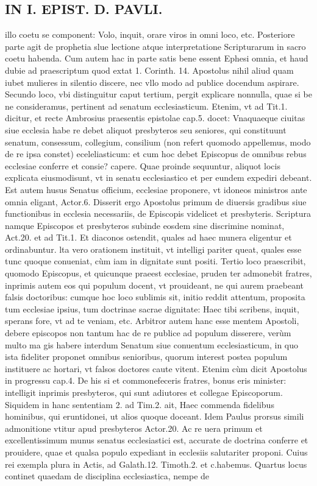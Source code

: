 \documentclass{article}
\begin{document}
\begin{pages}
\section*{IN I. EPIST. D. PAVLI. }
\marginpar{[ p.2 ]}\pstart illo coetu se component: Volo, inquit, orare viros in omni loco, etc. Posteriore parte agit de prophetia slue lectione atque  interpretatione Scripturarum in sacro coetu habenda.  \pend\pstart Cum autem hac in parte satis bene essent Ephesi omnia, et haud dubie ad praescriptum quod extat 1. Corinth. 14. Apostolus nihil aliud quam iubet mulieres in silentio discere, nec vllo modo ad publice docendum aspirare.  \pend\pstart Secundo loco, vbi distinguitur caput tertium, pergit explicare nonnulla, quae si be ne consideramus, pertinent ad senatum ecclesiasticum. Etenim, vt ad Tit.1. dicitur, et recte Ambrosius praesentis epistolae cap.5. docet: Vnaquaeque  ciuitas siue ecclesia habe re debet aliquot presbyteros seu seniores, qui constituunt senatum, consessum, collegium, consilium (non refert quomodo appellemus, modo de re ipsa constet) eceleliasticum: et cum hoc debet Episcopus de omnibus rebus ecclesiae conferre et consie? capere. Quae proinde sequuntur, aliquot locis explicata eiusmodisunt, vt in senatu ecclesiastico et per eundem expediri debeant. Est autem husus Senatus officium, ecclesiae proponere, vt idoneos ministros ante omnia eligant, Actor.6. Disserit ergo Apostolus primum de diuersis gradibus siue functionibus in ecclesia necessariis, de Episcopis videlicet et presbyteris. Scriptura namque  Episcopos et presbyteros subinde eosdem sine discrimine nominat, Act.20. et ad Tit.1. Et diaconos ostendit, quales ad haec munera eligentur et ordinabuntur. lta vero orationem instituit, vt intelligi pariter queat, quales esse tunc quoque  conueniat, cùm iam in dignitate sunt positi.  \pend\pstart Tertio loco praescribit, quomodo Episcopus, et quicunque  praeest ecclesiae, pruden ter admonebit fratres, inprimis autem eos qui populum docent, vt prouideant, ne qui aurem praebeant falsis doctoribus: cumque  hoc loco sublimis sit, initio reddit attentum, proposita tum ecclesiae ipsius, tum doctrinae sacrae dignitate: Haec tibi scribens, inquit, sperans fore, vt ad te veniam, etc. Arbitror autem hanc esse mentem Apostoli, debere episcopos non tantum hac de re publice ad populum disserere, verùm multo ma gis habere interdum Senatum siue conuentum ecclesiasticum, in quo ista fideliter proponet omnibus senioribus, quorum interest postea populum instituere ac hortari, vt   falsos doctores caute vitent. Etenim cùm dicit Apostolus in progressu cap.4. De his si   et commonefeceris fratres, bonus eris minister: intelligit inprimis presbyteros, qui sunt adiutores et collegae Episcoporum. Siquidem in hanc sententiam 2. ad Tim.2. ait, Haec commenda fidelibus hominibus, qui eruntidonei, ut alios quoque doceant. Idem Paulus prorsus simili admonitione vtitur apud presbyteros Actor.20. Ac re uera primum et excellentissimum munus senatus ecclesiastici est, accurate de doctrina conferre et prouidere, quae et qualsa populo expediant in ecclesiis salutariter proponi. Cuius rei exempla plura in Actis, ad Galath.12. Timoth.2. et c.habemus.  \pend\pstart Quartus locus continet quaedam de disciplina ecclesiastica, nempe de 
\end{pages}
\end{document}

